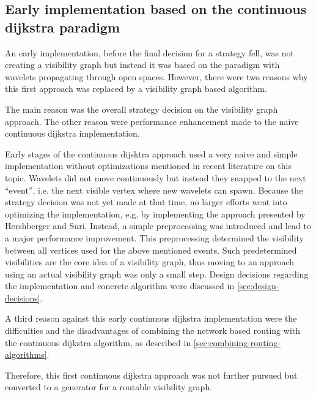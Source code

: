 	\subsection{Early implementation based on the continuous dijkstra paradigm}
	
		An early implementation, before the final decision for a strategy fell, was not creating a visibility graph but instead it was based on the  paradigm with wavelets propagating through open spaces.
		However, there were two reasons why this first approach was replaced by a visibility graph based algorithm.
		
		The main reason was the overall strategy decision on the visibility graph approach.
		The other reason were performance enhancement made to the naive continuous dijkstra implementation.
		
		Early stages of the continuous dijsktra approach used a very naive and simple implementation without optimizations mentioned in recent literature on this topic.
		Wavelets did not move continuously but instead they snapped to the next \enquote{event}, i.e. the next visible vertex where new wavelets can spawn.
		Because the strategy decision was not yet made at that time, no larger efforts went into optimizing the implementation, e.g. by implementing the approach presented by Hershberger and Suri\cite{hershberger-suri}.
		Instead, a simple preprocessing was introduced and lead to a major performance improvement.
		This preprocessing determined the visibility between all vertices used for the above mentioned events.
		Such predetermined visibilities are the core idea of a visibility graph, thus moving to an approach using an actual visibility graph was only a small step.
		Design decisions regarding the implementation and concrete algorithm were discussed in \cref{sec:design-decisions}.
		
		A third reason against this early continuous dijkstra implementation were the difficulties and the disadvantages of combining the network based routing with the continuous dijkstra algorithm, as described in \cref{sec:combining-routing-algorithms}.
		
		Therefore, this first continuous dijkstra approach was not further pursued but converted to a generator for a routable visibility graph.
	
